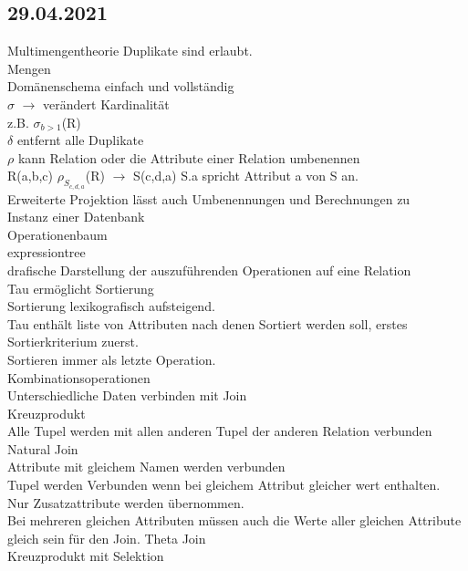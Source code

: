 \documentclass{article}
\begin{document}
	\subsection*{29.04.2021}
	Multimengentheorie Duplikate sind erlaubt. \\
	Mengen \\
	Domänenschema einfach und vollständig \\
	$\sigma$ $\to$ verändert Kardinalität \\
	z.B. $\sigma_{b>1}$(R) \\
	$\delta$ entfernt alle Duplikate \\
	$\rho$ kann Relation oder die Attribute einer Relation umbenennen \\
	R(a,b,c) $\rho_{S_{c,d,a}}$(R) $\to$ S(c,d,a)
	S.a spricht Attribut a von S an. \\
	Erweiterte Projektion lässt auch Umbenennungen und Berechnungen zu \\
	Instanz einer Datenbank \\
	Operationenbaum \\
	expressiontree \\
	drafische Darstellung der auszuführenden Operationen auf eine Relation \\
	Tau ermöglicht Sortierung \\
	Sortierung lexikografisch aufsteigend. \\
	Tau enthält liste von Attributen nach denen Sortiert werden soll, erstes Sortierkriterium zuerst. \\
	Sortieren immer als letzte Operation. \\
	Kombinationsoperationen \\
	Unterschiedliche Daten verbinden mit Join \\
	Kreuzprodukt \\
	Alle Tupel werden mit allen anderen Tupel der anderen Relation verbunden \\
	Natural Join \\
	Attribute mit gleichem Namen werden verbunden \\
	Tupel werden Verbunden wenn bei gleichem Attribut gleicher wert enthalten. \\
	Nur Zusatzattribute werden übernommen. \\
	Bei mehreren gleichen Attributen müssen auch die Werte aller gleichen Attribute gleich sein für den Join.
	Theta Join \\
	Kreuzprodukt mit Selektion \\
\end{document}
